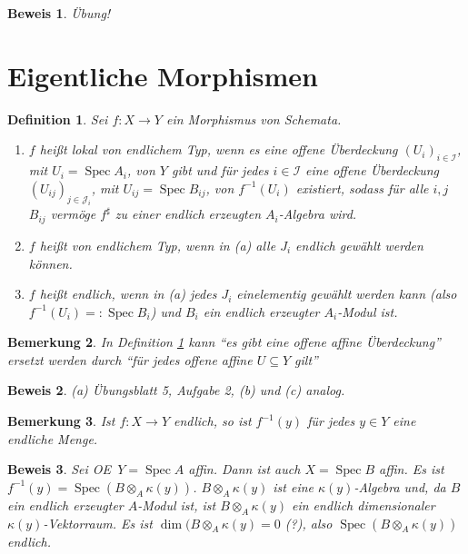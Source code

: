 \documentclass[a4paper,oneside]{scrbook}
\theoremstyle{break}
\newtheorem{Def}{Definition}[section]
\newtheorem{Bem}[Def]{Bemerkung}
\theoremstyle{nonumberbreak}
\theoremstyle{nonumberplain}
\newtheorem{Bew}{Beweis}
\theoremstyle{break}
\newcommand{\defeql}[0]{=\mathrel{\mathop:}}
\newcommand{\Spec}{%
	\ensuremath{\operatorname{Spec}}%
}
\renewcommand{\OE}{O\!\!E~}
\begin{document}
\begin{Bew}
  Übung!
\end{Bew}

\section{Eigentliche Morphismen}

\begin{Def}
  \label{def:8.1}
  Sei $f:X\to Y$ ein Morphismus von Schemata.
  \begin{enumerate}
  \item $f$ heißt \emph{lokal von endlichem Typ}, wenn es eine offene Überdeckung $(U_i)_{i\in\mathcal I}$, mit $U_i=\Spec A_i$, von $Y$ gibt
    und für jedes $i\in\mathcal I$ eine offene Überdeckung $(U_{ij})_{j\in\mathcal J_i}$, mit $U_{ij}=\Spec B_{ij}$, von $f^{-1}(U_i)$ existiert, 
    sodass für alle $i,j$ $B_{ij}$ vermöge $f^\sharp$ zu einer endlich erzeugten $A_i$-Algebra wird.
  \item $f$ heißt \emph{von endlichem Typ}, wenn in (a) alle $J_i$ endlich gewählt werden können.
  \item $f$ heißt \emph{endlich}, wenn in (a) jedes $J_i$ einelementig gewählt werden kann (also $f^{-1}(U_i)\defeql\Spec B_i$)
    und $B_i$ ein endlich erzeugter $A_i$-\emph{Modul} ist.
  \end{enumerate}
\end{Def}

\begin{Bem}
  \label{bem:8.2}
  In Definition \ref{def:8.1} kann ``es gibt eine offene affine Überdeckung'' ersetzt werden durch ``für jedes offene affine $U\subseteq Y$ gilt''
\end{Bem}

\begin{Bew}
 (a) Übungsblatt 5, Aufgabe 2, (b) und (c) analog.
\end{Bew}

\begin{Bem}
  \label{bem:8.3}
  Ist $f:X\to Y$ endlich, so ist $f^{-1}(y)$ für jedes $y\in Y$ eine endliche Menge.
\end{Bem}

\begin{Bew}
  Sei \OE $Y=\Spec A$ affin. Dann ist auch $X=\Spec B$ affin. Es ist $f^{-1}(y)=\Spec(B\otimes_A\kappa(y))$.
  $B\otimes_A\kappa(y)$ ist eine $\kappa(y)$-Algebra und, da $B$ ein endlich erzeugter $A$-Modul ist, ist $B\otimes_A\kappa(y)$ ein 
  endlich dimensionaler $\kappa(y)$-Vektorraum. Es ist $\dim(B\otimes_A\kappa(y)=0$ (?), also $\Spec (B\otimes_A\kappa(y))$ endlich.
\end{Bew}
\end{document}
